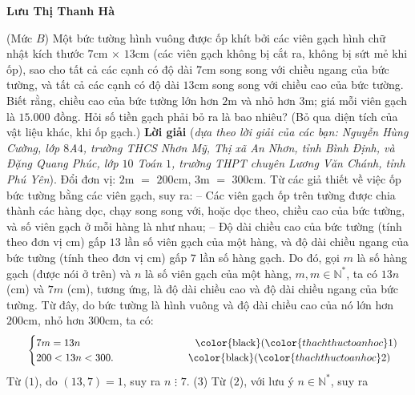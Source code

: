 \begin{multicols}{2}
	\begin{flushright}
		\textbf{\color{thachthuctoanhoc}Lưu Thị Thanh Hà}
	\end{flushright}
	{}
	(Mức $B$) Một bức tường hình vuông được ốp khít bởi các viên gạch hình chữ nhật kích thước $7$cm $\times$ $13$cm (các viên gạch không bị cắt ra, không bị sứt mẻ khi ốp), sao cho tất cả các cạnh có độ dài $7$cm song song với chiều ngang của bức tường, và tất cả các cạnh có độ dài $13$cm song song với chiều cao của bức tường.
	\vskip 0.05cm
	Biết rằng, chiều cao của bức tường lớn hơn $2$m và nhỏ hơn $3$m; giá mỗi viên gạch là $15{.}000$ đồng. Hỏi số tiền gạch phải bỏ ra là bao nhiêu? (Bỏ qua diện tích của vật liệu khác, khi ốp gạch.)
	\vskip 0.05cm
	\textbf{\color{thachthuctoanhoc}Lời giải} (\textit{dựa theo lời giải của các bạn: Nguyễn Hùng Cường, lớp $8$A$4$, trường THCS Nhơn Mỹ, Thị xã An Nhơn, tỉnh Bình Định, và Đặng Quang Phúc, lớp $10$ Toán $1$, trường THPT chuyên Lương Văn Chánh, tỉnh Phú Yên}).
	\vskip 0.05cm
	Đổi đơn vị: $2$m $=$ $200$cm, $3$m $=$ $300$cm.
	\vskip 0.05cm
	Từ các giả thiết về việc ốp bức tường bằng các viên gạch, suy ra:
	\vskip 0.05cm
	-- Các viên gạch ốp trên tường được chia \linebreak thành các hàng dọc, chạy song song với, hoặc dọc theo, chiều cao của bức tường, và số viên gạch ở mỗi hàng là như nhau;
	\vskip 0.05cm
	-- Độ dài chiều cao của bức tường (tính theo đơn vị cm) gấp $13$ lần số viên gạch của một hàng, và độ dài chiều ngang của bức tường (tính theo đơn vị cm) gấp $7$ lần số hàng gạch.
	\vskip 0.05cm
	Do đó, gọi $m$ là số hàng gạch (được nói ở trên) và $n$ là số viên gạch của một hàng, $m,m \in \mathbb{N^*}$,  ta có $13n$ (cm) và $7m$ (cm), tương ứng, là độ dài chiều cao và độ dài chiều ngang của bức tường. Từ đây, do bức tường là hình vuông và độ dài chiều cao của nó lớn hơn $200$cm, nhỏ hơn $300$cm, ta có:
	\begin{align*}
	\hspace*{20pt}\begin{cases}
			7m = 13n \hspace*{112pt} \text{\color{black}($\color{thachthuctoanhoc}1$)}\\
			200 < 13n < 300. \hspace*{73pt} \text{\color{black}($\color{thachthuctoanhoc}2$)}
		\end{cases}
	\end{align*}
	Từ ($1$), do $(13, 7) = 1$, suy ra $n \,\,\vdots\,\, 7$. \hfill ($3$)
	\vskip 0.05cm
	Từ ($2$), với lưu ý $n \in \mathbb{N^*}$,  suy ra  

\end{multicols}
